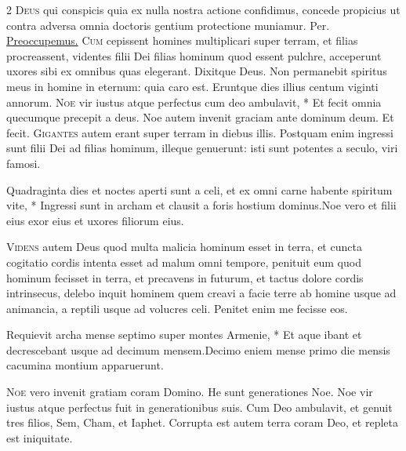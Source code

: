 \begin{multicols*}{2}
\lettrine[lines=2]{\zallmancaps \color{Blue} D}{eus} qui conspicis quia ex nulla nostra actione confidimus, concede propicius ut contra adversa omnia doctoris gentium protectione muniamur. Per.
 \hyperlink{preoccupemus-faciem-invitatorium}{Preoccupemus.}
\lettrine[lines=2]{\zallmancaps \color{Red} C}{um} cepissent homines multiplicari super terram, et filias procreassent, videntes filii Dei filias hominum quod essent pulchre, acceperunt uxores sibi ex omnibus quas elegerant. Dixitque Deus. Non permanebit spiritus meus in homine in eternum: quia caro est. Eruntque dies illius centum viginti annorum. \R
\lettrine[lines=2]{\zallmancaps \color{Blue} N}{oe} \hypertarget{noe-vir-iustus}{\label{noe-vir-iustus}} vir iustus atque perfectus cum deo ambulavit, * Et fecit omnia quecumque precepit a deus. \V Noe autem invenit graciam ante dominum deum. Et fecit.
\lettrine[lines=2]{\zallmancaps \color{Red} G}{igantes} autem erant super terram in diebus illis. Postquam enim ingressi sunt filii Dei ad filias hominum, illeque genuerunt: isti sunt potentes a seculo, viri famosi.
\begin{responsory}
{Quadraginta dies et noctes aperti sunt a celi, et ex omni carne habente spiritum vite, * Ingressi sunt in archam et clausit a foris hostium dominus.}{Noe vero et filii eius exor eius et uxores filiorum eius.}
\end{responsory}%
\lettrine[lines=2]{\zallmancaps \color{Blue} V}{idens} autem Deus quod multa malicia hominum esset in terra, et cuncta cogitatio cordis intenta esset ad malum omni tempore, penituit eum quod hominum fecisset in terra, et precavens in futurum, et tactus dolore cordis intrinsecus, delebo inquit hominem quem creavi a facie terre ab homine usque ad animancia, a reptili usque ad volucres celi. Penitet enim me fecisse eos.
\begin{responsory-doxology}
{Requievit archa mense septimo super montes Armenie, * Et aque ibant et decrescebant usque ad decimum mensem.}{Decimo eniem mense primo die mensis cacumina montium apparuerunt.}
\end{responsory-doxology}%
\lettrine[lines=2]{\zallmancaps \color{Red} N}{oe} vero invenit gratiam coram Domino. He sunt generationes Noe. Noe vir iustus atque perfectus fuit in generationibus suis. Cum Deo ambulavit, et genuit tres filios, Sem, Cham, et Iaphet. Corrupta est autem terra coram Deo, et repleta est iniquitate.

\end{multicols*}
